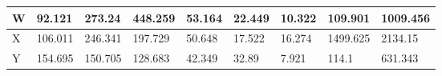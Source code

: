 \begin{landscape}
\begin{longtable}[c]{|l|llllllll|}
    W                                                                               & \multicolumn{1}{l|}{92.121}                                                         & \multicolumn{1}{l|}{273.24}                                                         & \multicolumn{1}{l|}{448.259}                                                        & \multicolumn{1}{l|}{53.164}                                                         & \multicolumn{1}{l|}{22.449}                                    & \multicolumn{1}{l|}{10.322}                                    & \multicolumn{1}{l|}{109.901}                                       & 1009.456                                                                               \\ \hline
    X                                                                               & \multicolumn{1}{l|}{106.011}                                                        & \multicolumn{1}{l|}{246.341}                                                        & \multicolumn{1}{l|}{197.729}                                                        & \multicolumn{1}{l|}{50.648}                                                         & \multicolumn{1}{l|}{17.522}                                    & \multicolumn{1}{l|}{16.274}                                    & \multicolumn{1}{l|}{1499.625}                                      & 2134.15                                                                                \\ \hline
    Y                                                                               & \multicolumn{1}{l|}{154.695}                                                        & \multicolumn{1}{l|}{150.705}                                                        & \multicolumn{1}{l|}{128.683}                                                        & \multicolumn{1}{l|}{42.349}                                                         & \multicolumn{1}{l|}{32.89}                                     & \multicolumn{1}{l|}{7.921}                                     & \multicolumn{1}{l|}{114.1}                                         & 631.343                                                                                \\ \hline
  \end{longtable}
\end{landscape}


